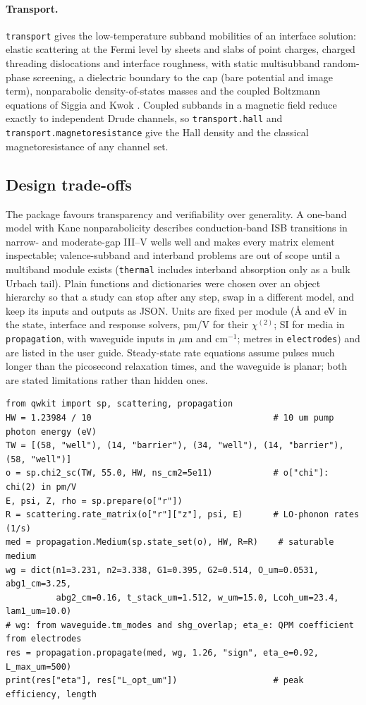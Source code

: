 \documentclass[11pt]{article}
\newcommand{\chitwo}{\chi^{(2)}}
\newcommand{\code}[1]{\texttt{#1}}
\begin{document}
\paragraph{Transport.} \code{transport} gives the low-temperature subband mobilities of an interface solution: elastic scattering at the Fermi level by sheets and slabs of point charges, charged threading dislocations and interface roughness, with static multisubband random-phase screening, a dielectric boundary to the cap (bare potential and image term), nonparabolic density-of-states masses and the coupled Boltzmann equations of Siggia and Kwok \cite{SiggiaKwok1970}. Coupled subbands in a magnetic field reduce exactly to independent Drude channels, so \code{transport.hall} and \code{transport.magnetoresistance} give the Hall density and the classical magnetoresistance of any channel set.

\subsection{Design trade-offs}
The package favours transparency and verifiability over generality. A one-band model with Kane nonparabolicity describes conduction-band ISB transitions in narrow- and moderate-gap III--V wells well \cite{Nelson1987,Sirtori1994} and makes every matrix element inspectable; valence-subband and interband problems are out of scope until a multiband module exists (\code{thermal} includes interband absorption only as a bulk Urbach tail). Plain functions and dictionaries were chosen over an object hierarchy so that a study can stop after any step, swap in a different model, and keep its inputs and outputs as JSON. Units are fixed per module (\AA{} and eV in the state, interface and response solvers, pm/V for their $\chitwo$; SI for media in \code{propagation}, with waveguide inputs in $\mu$m and cm$^{-1}$; metres in \code{electrodes}) and are listed in the user guide. Steady-state rate equations assume pulses much longer than the picosecond relaxation times, and the waveguide is planar; both are stated limitations rather than hidden ones.

\begin{lstlisting}[float=t,caption={From layers to conversion efficiency (abridged from \code{docs/examples.py}).},captionpos=b,label=lst:ex]
from qwkit import sp, scattering, propagation
HW = 1.23984 / 10                                    # 10 um pump photon energy (eV)
TW = [(58, "well"), (14, "barrier"), (34, "well"), (14, "barrier"), (58, "well")]
o = sp.chi2_sc(TW, 55.0, HW, ns_cm2=5e11)            # o["chi"]: chi(2) in pm/V
E, psi, Z, rho = sp.prepare(o["r"])
R = scattering.rate_matrix(o["r"]["z"], psi, E)      # LO-phonon rates (1/s)
med = propagation.Medium(sp.state_set(o), HW, R=R)    # saturable medium
wg = dict(n1=3.231, n2=3.338, G1=0.395, G2=0.514, O_um=0.0531, abg1_cm=3.25,
          abg2_cm=0.16, t_stack_um=1.512, w_um=15.0, Lcoh_um=23.4, lam1_um=10.0)
# wg: from waveguide.tm_modes and shg_overlap; eta_e: QPM coefficient from electrodes
res = propagation.propagate(med, wg, 1.26, "sign", eta_e=0.92, L_max_um=500)
print(res["eta"], res["L_opt_um"])                   # peak efficiency, length
\end{lstlisting}
\end{document}
